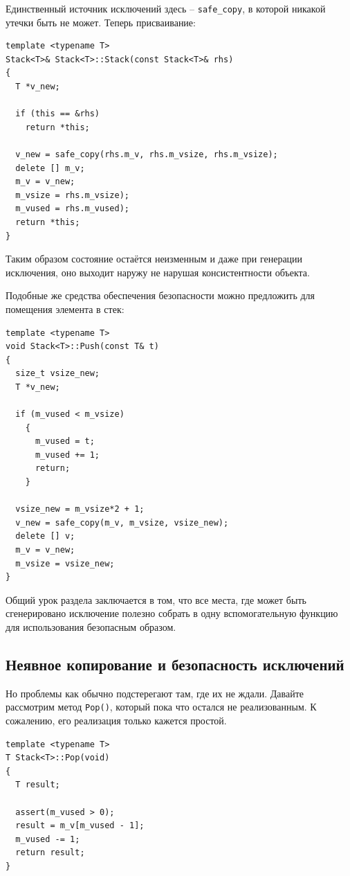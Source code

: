 \documentclass[a4paper,12pt,oneside]{article}
\begin{document}
Единственный источник исключений здесь -- \lstinline!safe_copy!, в которой никакой утечки быть не может. Теперь присваивание:

\begin{lstlisting}
template <typename T>
Stack<T>& Stack<T>::Stack(const Stack<T>& rhs)
{
  T *v_new;

  if (this == &rhs)
    return *this;

  v_new = safe_copy(rhs.m_v, rhs.m_vsize, rhs.m_vsize);
  delete [] m_v;
  m_v = v_new;
  m_vsize = rhs.m_vsize); 
  m_vused = rhs.m_vused);
  return *this;
}
\end{lstlisting}

Таким образом состояние остаётся неизменным и даже при генерации исключения, оно выходит наружу не нарушая консистентности объекта.

Подобные же средства обеспечения безопасности можно предложить для помещения элемента в стек:

\begin{lstlisting}
template <typename T>
void Stack<T>::Push(const T& t)
{
  size_t vsize_new;
  T *v_new;

  if (m_vused < m_vsize)
    {
      m_vused = t;
      m_vused += 1;
      return;
    }

  vsize_new = m_vsize*2 + 1;
  v_new = safe_copy(m_v, m_vsize, vsize_new);
  delete [] v;
  m_v = v_new;
  m_vsize = vsize_new;
}
\end{lstlisting}

Общий урок раздела заключается в том, что все места, где может быть сгенерировано исключение полезно собрать в одну вспомогательную функцию для использования безопасным образом.

\subsection{Неявное копирование и безопасность исключений}

Но проблемы как обычно подстерегают там, где их не ждали. Давайте рассмотрим метод \lstinline!Pop()!, который пока что остался не реализованным. К сожалению, его реализация только кажется простой.

\begin{lstlisting}
template <typename T>
T Stack<T>::Pop(void)
{
  T result;

  assert(m_vused > 0);
  result = m_v[m_vused - 1];
  m_vused -= 1;
  return result;
}
\end{lstlisting}
\end{document}
